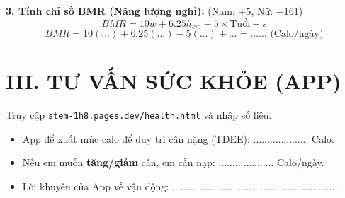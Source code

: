 \documentclass[12pt,a4paper]{article}
\begin{document}
\textbf{3. Tính chỉ số BMR (Năng lượng nghỉ):}
(Nam: $+5$, Nữ: $-161$)
$$ BMR = 10w + 6.25h_{cm} - 5\times\text{Tuổi} + s $$
$$ BMR = 10(\dots) + 6.25(\dots) - 5(\dots) + \dots = \dots\dots \text{ (Calo/ngày)} $$

\section*{\color{medblue} III. TƯ VẤN SỨC KHỎE (APP)}
Truy cập \texttt{stem-1h8.pages.dev/health.html} và nhập số liệu.

\begin{itemize}
    \item App để xuất mức calo để duy trì cân nặng (TDEE): .................... Calo.
    \item Nếu em muốn \textbf{tăng/giảm} cân, em cần nạp: .................... Calo/ngày.
    \item Lời khuyên của App về vận động: .............................................................
\end{itemize}
\end{document}
